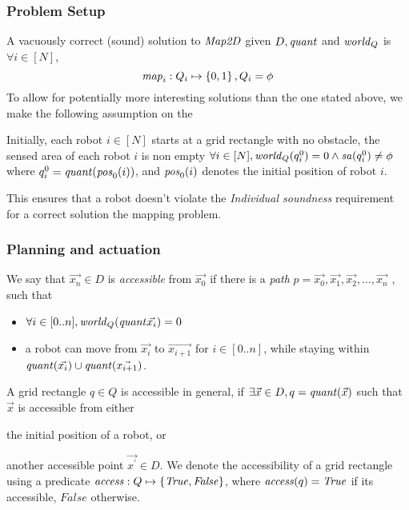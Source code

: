 \subsubsection{Problem Setup}

A vacuously correct (sound) solution to $\mathit{Map2D}$ given $D, \mathit{quant}$ and $\mathit{world}_Q$ is $\forall i \in [N]$, $$\mathit{map}_i : Q_i \mapsto \left\{0,1\right\}, Q_i = \phi$$ To allow for potentially more interesting solutions than the one stated above, we make the following assumption on the
\begin{assumption}
Initially, each robot $i\in[N]$ starts at a grid rectangle with no obstacle, the sensed area of each robot $i$ is non empty
$\forall i \in [N], \mathit{world}_Q(q^0_i) = 0\wedge \mathit{sa}(q^0_i) \neq \phi$
where $q^0_i = \mathit{quant}(\mathit{pos}_0(i))$, and $\mathit{pos}_0(i)$ denotes the initial position of robot $i$.
\end{assumption}

This ensures that a robot doesn't violate the \emph{Individual soundness} requirement for a correct solution the mapping problem.

\subsubsection{Planning and actuation}

\begin{definition}
    We say that $\Vec{x_n}\in D$ is \emph{accessible} from $\Vec{x_0}$ if there is a \emph{path} $p = \Vec{x_0},\Vec{x_1}, \Vec{x_2},\ldots, \Vec{x_n}$ , such that
    \begin{itemize}
        \item $\forall i \in [0..n],\mathit{world}_Q(\mathit{quant}{\Vec{x_i}}) = 0$
        \item a robot can move from $\Vec{x_i}$ to $\Vec{x_{i+1}}$ for $i \in [0..n]$, while staying within $\mathit{quant}(\Vec{x_i}) \cup \mathit{quant}(\Vec{x_{i+1}})$.
    \end{itemize}
\end{definition}

A grid rectangle $q\in Q$ is accessible in general, if $\exists \Vec{x}\in D, q = \mathit{quant}(\Vec{x})$ such that $\Vec{x}$ is accessible from either \begin{inparaenum} [(a)] \item the initial position of a robot, or \item another accessible point $\Vec{x^\prime}\in D$. We denote the accessibility of a grid rectangle using a predicate $\mathit{access} : Q \mapsto \left\{\mathit{True}, \mathit{False}\right\}$, where $\mathit{access}(q) = \mathit{True}$ if its accessible,  $\mathit{False}$ otherwise.
\end{inparaenum}

